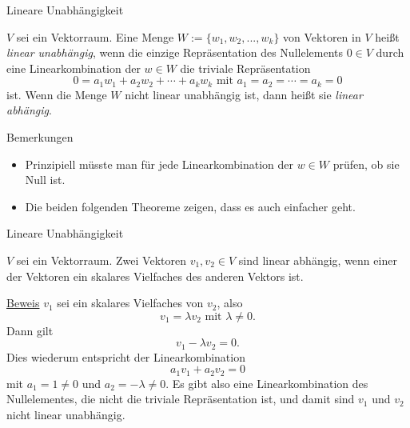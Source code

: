\documentclass[
  8pt,
  ignorenonframetext,
]{beamer}
\providecommand{\tightlist}{%
  \setlength{\itemsep}{0pt}\setlength{\parskip}{0pt}}
\begin{document}
\begin{frame}{Lineare Unabhängigkeit}
\protect\hypertarget{lineare-unabhuxe4ngigkeit-1}{}
\vspace{3mm}
\small
\begin{definition}
\justifying
$V$ sei ein Vektorraum. Eine Menge $W := \{w_1, w_2, ...,w_k\}$ von Vektoren in $V$ heißt
\textit{linear unabhängig}, wenn die einzige Repräsentation des Nullelements
$0 \in V$ durch eine Linearkombination der $w \in W$ die triviale
Repräsentation
\begin{equation}
0 = a_1 w_1 + a_2 w_2 + \cdots + a_k w_k \mbox{ mit } a_1 = a_2 =  \cdots = a_k = 0
\end{equation}
ist. Wenn die Menge $W$ nicht linear unabhängig ist, dann heißt sie \textit{linear abhängig}.
\end{definition}

Bemerkungen

\begin{itemize}
\tightlist
\item
  Prinzipiell müsste man für jede Linearkombination der \(w \in W\)
  prüfen, ob sie Null ist.
\item
  Die beiden folgenden Theoreme zeigen, dass es auch einfacher geht.
\end{itemize}
\end{frame}

\begin{frame}{Lineare Unabhängigkeit}
\protect\hypertarget{lineare-unabhuxe4ngigkeit-2}{}
\vspace{3mm}
\small
\begin{theorem}
\justifying
\normalfont
$V$ sei ein Vektorraum. Zwei Vektoren $v_1, v_2 \in V$ sind linear abhängig,
wenn einer der Vektoren ein skalares Vielfaches des anderen Vektors ist.
\end{theorem}

\footnotesize

\underline{Beweis} \vspace{1mm} \(v_1\) sei ein skalares Vielfaches von
\(v_2\), also \begin{equation}
v_1 = \lambda v_2 \mbox{ mit } \lambda \neq 0.
\end{equation} Dann gilt \begin{equation}
v_1 - \lambda v_2 = 0.
\end{equation} Dies wiederum entspricht der Linearkombination
\begin{equation}
a_1v_1 + a_2v_2 = 0
\end{equation} mit \(a_1 = 1 \neq 0\) und \(a_2 = -\lambda \neq 0\). Es
gibt also eine Linearkombination des Nullelementes, die nicht die
triviale Repräsentation ist, und damit sind \(v_1\) und \(v_2\) nicht
linear unabhängig.
\end{frame}
\end{document}
